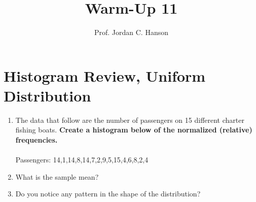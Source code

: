 \documentclass{article}
\begin{document}
\title{Warm-Up 11}
\author{Prof. Jordan C. Hanson}

\maketitle

\section{Histogram Review, Uniform Distribution}

\begin{enumerate}
\item The data that follow are the number of passengers on 15 different charter fishing boats.  \textbf{Create a histogram below of the normalized (relative) frequencies.} \\ \\
Passengers: 14,1,14,8,14,7,2,9,5,15,4,6,8,2,4
 \\ \vspace{3cm}
\item What is the sample mean? \\ \vspace{2cm}
\item Do you notice any pattern in the shape of the distribution?
\end{enumerate}
\end{document}
